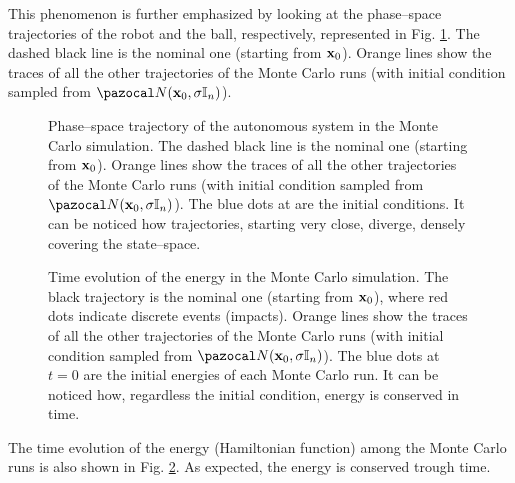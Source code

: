 This phenomenon is further emphasized by looking at the phase--space trajectories of the robot and the ball, respectively, represented in Fig. \ref{fig:chaos2}. The dashed black line is the nominal one (starting from $\mathbf{x}_0$). Orange lines show the traces of all the other trajectories of the Monte Carlo runs (with initial condition sampled from $\N(\xb_0,\sigma\mathbb{I}_n)$). 
%
\begin{figure}[!t]
    \centering
    \caption[Phase--space trajectory of the autonomous system in the Monte Carlo simulation]{Phase--space trajectory of the autonomous system in the Monte Carlo simulation. The dashed black line is the nominal one (starting from $\mathbf{x}_0$). Orange lines show the traces of all the other trajectories of the Monte Carlo runs (with initial condition sampled from $\N(\xb_0,\sigma\mathbb{I}_n)$). The blue dots at are the initial conditions. It can be noticed how trajectories, starting very close, diverge, densely covering the state--space.}
    \label{fig:chaos2}
\end{figure}
%
\begin{figure}[!h]
    \centering
    \caption[Time evolution of the energy in the Monte Carlo simulation]{Time evolution of the energy in the Monte Carlo simulation. The black trajectory is the nominal one (starting from $\mathbf{x}_0$), where red dots indicate discrete events (impacts). Orange lines show the traces of all the other trajectories of the Monte Carlo runs (with initial condition sampled from $\N(\xb_0,\sigma\mathbb{I}_n)$). The blue dots at $t=0$ are the initial energies of each Monte Carlo run. It can be noticed how, regardless the initial condition, energy is conserved in time.}
    \label{fig:chaos3}
\end{figure}

The time evolution of the energy (Hamiltonian function) among the Monte Carlo runs is also shown in Fig. \ref{fig:chaos3}. As expected, the energy is conserved trough time.
%

